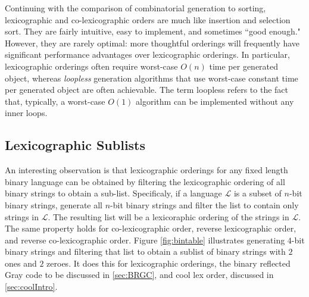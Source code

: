 Continuing with the comparison of combinatorial generation to sorting, lexicographic and co-lexicographic orders are much like insertion and selection sort.  They are fairly intuitive, easy to implement, and sometimes ``good enough."  However, they are rarely optimal: more thoughtful orderings will frequently have significant performance advantages over lexicographic orderings. In particular, lexicographic orderings often require worst-case $O(n)$ time per generated object, whereas \emph{loopless} generation algorithms that use worst-case constant time per generated object are often achievable. The term loopless refers to the fact that, typically, a worst-case $O(1)$ algorithm can be implemented without any inner loops.

 \subsection{Lexicographic Sublists}
 An interesting observation is that lexicographic orderings for any fixed length binary language can be obtained by filtering the lexicographic ordering of all binary strings to obtain a sub-list. Specificaly, if a language $\mathcal{L}$ is a subset of $n$-bit binary strings, generate all $n$-bit binary strings and filter the list to contain only strings in $\mathcal{L}$.  The resulting list will be a lexicoraphic ordering of the strings in $\mathcal{L}$.  The same property holds for co-lexicographic order, reverse lexicographic order, and reverse co-lexicographic order.  Figure \ref{fig:bintable} illustrates generating $4$-bit binary strings and filtering that list to obtain a sublist of binary strings with $2$ ones and $2$ zeroes.  It does this for lexicographic orderings, the binary reflected Gray code to be discussed in \ref{sec:BRGC}, and cool lex order, discussed in \ref{sec:coolIntro}.


